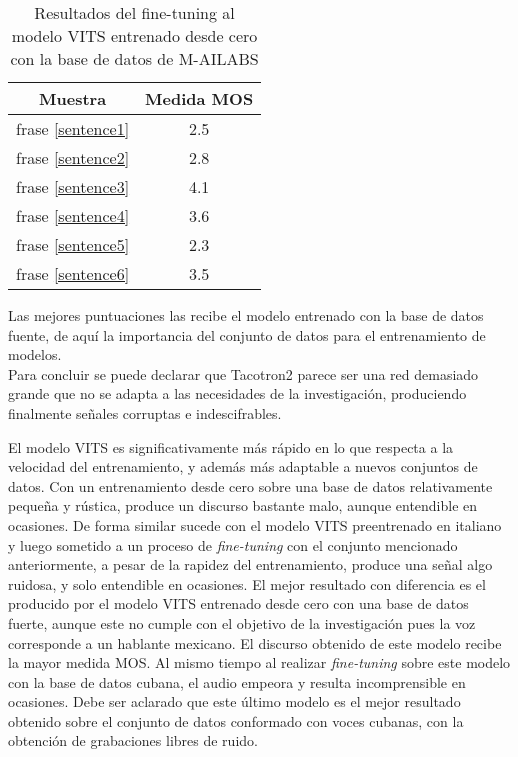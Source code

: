 \begin{table}[H]
	\begin{center} 
		\begin{tabular}{ |c|c| } 
			\hline
			Muestra & Medida MOS \\
			\hline
			frase \ref{sentence1} & 2.5 \\
			frase \ref{sentence2} & 2.8 \\
			frase \ref{sentence3} & 4.1 \\
			frase \ref{sentence4} & 3.6 \\
			frase \ref{sentence5} & 2.3 \\
			frase \ref{sentence6} & 3.5 \\
			\hline
		\end{tabular}
		\caption{Resultados del fine-tuning al modelo VITS entrenado desde cero con la base de datos de M-AILABS} 
	\end{center}
\end{table}

Las mejores puntuaciones las recibe el modelo entrenado con la base de datos fuente, de aquí la importancia del conjunto de datos para el entrenamiento de modelos.\\


Para concluir se puede declarar que Tacotron2 parece ser una red demasiado grande que no se adapta a las necesidades de la investigación, produciendo finalmente señales corruptas e indescifrables.

El modelo VITS es significativamente más rápido en lo que respecta a la velocidad del entrenamiento, y además más adaptable a nuevos conjuntos de datos. Con un entrenamiento desde cero sobre una base de datos relativamente pequeña y rústica, produce un discurso bastante malo, aunque entendible en ocasiones. De forma similar sucede con el modelo VITS preentrenado en italiano y luego sometido a un proceso de \textit{fine-tuning} con el conjunto mencionado anteriormente, a pesar de la rapidez del entrenamiento, produce una señal algo ruidosa, y solo entendible en ocasiones. El mejor resultado con diferencia es el producido por el modelo VITS entrenado desde cero con una base de datos fuerte, aunque este no cumple con el objetivo de la investigación pues la voz corresponde a un hablante mexicano. El discurso obtenido de este modelo recibe la mayor medida MOS. Al mismo tiempo al realizar \textit{fine-tuning} sobre este modelo con la base de datos cubana, el audio empeora y resulta incomprensible en ocasiones. Debe ser aclarado que este último modelo es el mejor resultado obtenido sobre el conjunto de datos conformado con voces cubanas, con la obtención de grabaciones libres de ruido. 




